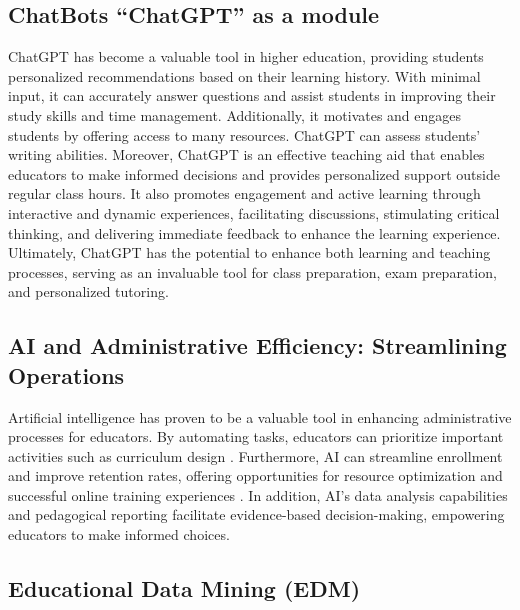 \subsection{ChatBots ``ChatGPT'' as a module}

ChatGPT has become a valuable tool in higher education, providing students personalized recommendations
based on their learning history. With minimal input, it can accurately answer questions and assist students
in improving their study skills and time management. Additionally, it motivates and engages students by
offering access to many resources. ChatGPT can assess students' writing abilities\citep{mohammed_exploring_2023}.
Moreover, ChatGPT is an effective teaching aid that enables educators to make informed decisions and provides
personalized support outside regular class hours. It also promotes engagement and active learning through interactive
and dynamic experiences, facilitating discussions, stimulating critical thinking, and delivering immediate feedback
to enhance the learning experience\citep{schonberger_chatgpt_2023}.
Ultimately, ChatGPT has the potential to enhance both learning and teaching processes,
serving as an invaluable tool for class preparation, exam preparation, and personalized tutoring\citep{domenech_chatgpt_2023}.



\subsection{AI and Administrative Efficiency: Streamlining Operations}
Artificial intelligence has proven to be a valuable tool in enhancing administrative processes for educators.
By automating tasks, educators can prioritize important activities such as curriculum design \citep{drach_use_2023}.
Furthermore, AI can streamline enrollment and improve retention rates, offering opportunities for resource optimization
and successful online training experiences \citep{lukianets_promises_2023}. In addition, AI's data analysis capabilities
and pedagogical reporting facilitate evidence-based decision-making, empowering educators to make informed choices\citep{guerrero-quinonez_artificial_2023}.

\subsection{Educational Data Mining (EDM)}

